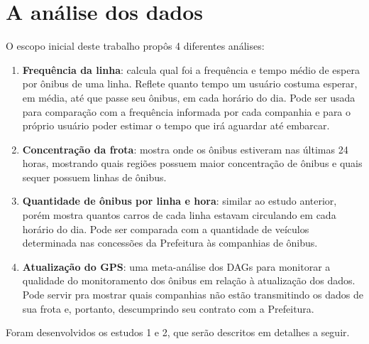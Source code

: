 \chapter{A análise dos dados}\label{chp:CAP_ANALISE}

O escopo inicial deste trabalho propôs 4 diferentes análises:

\begin{enumerate}

\item \textbf{Frequência da linha}: calcula qual foi a frequência e tempo médio de espera por ônibus de uma linha. Reflete quanto tempo um usuário costuma esperar, em média, até que passe seu ônibus, em cada horário do dia. Pode ser usada para comparação com a frequência informada por cada companhia e para o próprio usuário poder estimar o tempo que irá aguardar até embarcar.

\item \textbf{Concentração da frota}: mostra onde os ônibus estiveram nas últimas 24 horas, mostrando quais regiões possuem maior concentração de ônibus e quais sequer possuem linhas de ônibus.

\item \textbf{Quantidade de ônibus por linha e hora}: similar ao estudo anterior, porém  mostra quantos carros de cada linha estavam circulando em cada horário do dia. Pode ser comparada com a quantidade de veículos determinada nas concessões da Prefeitura às companhias de ônibus.

\item \textbf{Atualização do GPS}: uma meta-análise dos DAGs para monitorar a qualidade do monitoramento dos ônibus em relação à atualização dos dados. Pode servir pra mostrar quais companhias não estão transmitindo os dados de sua frota e, portanto, descumprindo seu contrato com a Prefeitura.

\end{enumerate}

Foram desenvolvidos os estudos 1 e 2, que serão descritos em detalhes a seguir.




